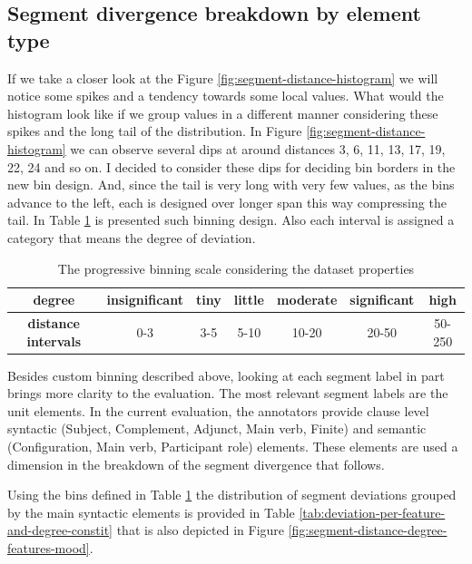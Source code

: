 \subsection{Segment divergence breakdown by element type}

If we take a closer look at the Figure \ref{fig:segment-distance-histogram} we will notice some spikes and a tendency towards some local values. What would the histogram look like if we group values in a different manner considering these spikes and the long tail of the distribution. 
In Figure \ref{fig:segment-distance-histogram} we can observe several dips at around distances 3, 6, 11, 13, 17, 19, 22, 24 and so on. I decided to consider these dips for deciding bin borders in the new bin design. And, since the tail is very long with very few values, as the bins advance to the left, each is designed over longer span this way compressing the tail. In Table \ref{tab:progressive-bins} is presented such binning design. Also each interval is assigned a category that means the degree of deviation.

\begin{table}[!ht]
    \begin{tabular}{|c|c|c|c|c|c|c|}
        \hline
        \textbf{degree}          & insignificant & tiny & little & moderate & significant & high   \\ \hline
        \textbf{distance intervals} & 0-3           & 3-5  & 5-10   & 10-20    & 20-50       & 50-250 \\ \hline
    \end{tabular}
    \caption{The progressive binning scale considering the dataset properties}
    \label{tab:progressive-bins}
\end{table}

Besides custom binning described above, looking at each segment label in part brings more clarity to the evaluation. The most relevant segment labels are the unit elements. In the current evaluation, the annotators provide clause level syntactic (Subject, Complement, Adjunct, Main verb, Finite) and semantic (Configuration, Main verb, Participant role) elements. These elements are used a dimension in the breakdown of the segment divergence that follows. 

Using the bins defined in Table \ref{tab:progressive-bins} the distribution of segment deviations grouped by the main syntactic elements is provided in Table \ref{tab:deviation-per-feature-and-degree-constit} that is also depicted in Figure \ref{fig:segment-distance-degree-features-mood}. 

